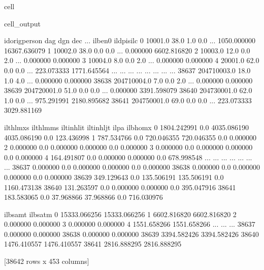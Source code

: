\documentclass[letterpaper,10pt,english]{sphinxmanual}
\begin{document}
\begin{sphinxuseclass}{cell}
\begin{sphinxuseclass}{cell_output}
\begin{sphinxVerbatim}[commandchars=\\\{\}]
       idorigperson   dag  dgn  dec  ...      il\PYGZus{}ben0    il\PYGZus{}dpisilc  \PYGZbs{}
0           10001.0  38.0  1.0  0.0  ...  1050.000000  16367.636079   
1           10002.0  38.0  0.0  0.0  ...     0.000000   6602.816820   
2           10003.0  12.0  0.0  2.0  ...     0.000000      0.000000   
3           10004.0   8.0  0.0  2.0  ...     0.000000      0.000000   
4           20001.0  62.0  0.0  0.0  ...   223.073333   1771.645564   
...             ...   ...  ...  ...  ...          ...           ...   
38637   204710003.0  18.0  1.0  4.0  ...     0.000000      0.000000   
38638   204710004.0   7.0  0.0  2.0  ...     0.000000      0.000000   
38639   204720001.0  51.0  0.0  0.0  ...     0.000000   3391.598079   
38640   204730001.0  62.0  1.0  0.0  ...   975.291991   2180.895682   
38641   204750001.0  69.0  0.0  0.0  ...   223.073333   3029.881169   

        il\PYGZus{}thlmx\PYGZus{}s  il\PYGZus{}thlmm\PYGZus{}s   il\PYGZus{}tinhlit   il\PYGZus{}tinhljt  il\PYGZus{}pa     il\PYGZus{}bhomx  \PYGZbs{}
0      1804.242991         0.0  4035.086190  4035.086190    0.0   123.436998   
1       787.534766         0.0   720.046355   720.046355    0.0     0.000000   
2         0.000000         0.0     0.000000     0.000000    0.0     0.000000   
3         0.000000         0.0     0.000000     0.000000    0.0     0.000000   
4       164.491807         0.0     0.000000     0.000000    0.0   678.998548   
...            ...         ...          ...          ...    ...          ...   
38637     0.000000         0.0     0.000000     0.000000    0.0     0.000000   
38638     0.000000         0.0     0.000000     0.000000    0.0     0.000000   
38639   349.129643         0.0   135.506191   135.506191    0.0  1160.473138   
38640   131.263597         0.0     0.000000     0.000000    0.0   395.047916   
38641   183.583065         0.0    37.968866    37.968866    0.0   716.030976   

           il\PYGZus{}bsamt      il\PYGZus{}bsatm  
0      15333.066256  15333.066256  
1       6602.816820   6602.816820  
2          0.000000      0.000000  
3          0.000000      0.000000  
4       1551.658266   1551.658266  
...             ...           ...  
38637      0.000000      0.000000  
38638      0.000000      0.000000  
38639   3394.582426   3394.582426  
38640   1476.410557   1476.410557  
38641   2816.888295   2816.888295  

[38642 rows x 453 columns]
\end{sphinxVerbatim}

\end{sphinxuseclass}
\end{sphinxuseclass}
\end{document}
